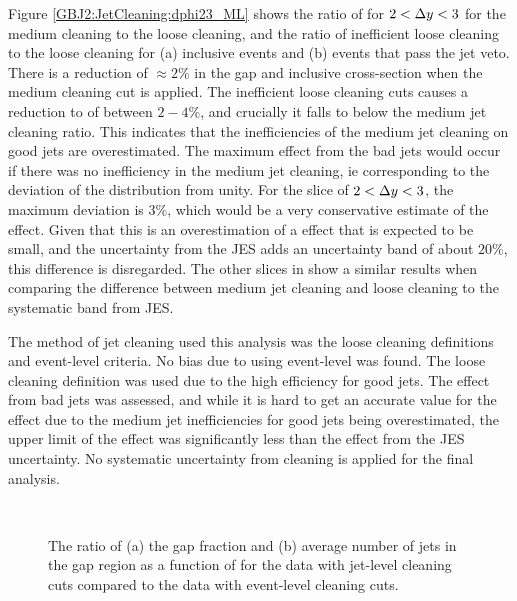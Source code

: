 Figure \ref{GBJ2:JetCleaning:dphi23_ML} shows the ratio of \dphiDist for $2<\mbox{$\Delta y$}{}<3$ for the medium cleaning to the loose cleaning, and the ratio of inefficient loose cleaning to the loose cleaning for (a) inclusive events and (b) events that pass the jet veto.
There is a reduction of $\approx 2\%$ in the gap and inclusive cross-section when the medium cleaning cut is applied.
The inefficient loose cleaning cuts causes a reduction to \dphiDist{} of between $2-4\%$, and crucially it falls to below the medium jet cleaning ratio. 
This indicates that the inefficiencies of the medium jet cleaning on good jets are overestimated.
The maximum effect from the bad jets would occur if there was no inefficiency in the medium jet cleaning, ie corresponding to the deviation of the distribution from unity. 
For the slice of $2<\mbox{$\Delta y$}{}<3$, the maximum deviation is $3\%$, which would be a very conservative estimate of the effect.
Given that this is an overestimation of a effect that is expected to be small, and the uncertainty from the JES adds an uncertainty band of about $20\%$, this difference is disregarded. 
The other slices in \dy{} show a similar results when comparing the difference between medium jet cleaning and loose cleaning to the systematic band from JES.


The method of jet cleaning used this analysis was the loose cleaning definitions and event-level criteria.
No bias due to using event-level was found. 
The loose cleaning definition was used due to the high efficiency for good jets.
The effect from bad jets was assessed, and while it is hard to get an accurate value for the effect due to the medium jet inefficiencies for good jets being overestimated, the upper limit of the effect was significantly less than the effect from the JES uncertainty. 
No systematic uncertainty from cleaning is applied for the final analysis.


\begin{figure}
\centering
\mbox{
              \quad
              \quad
                              }
\caption[Comparison between event and jet level cleaning cuts on the gap fraction and average number of jets]{
The ratio of (a) the gap fraction and (b) average number of jets in the gap region as a function of \dy{} for the data with jet-level cleaning cuts compared to the data with event-level cleaning cuts.
\label{GBJ2:JetCleaning:gap}}
\end{figure}


